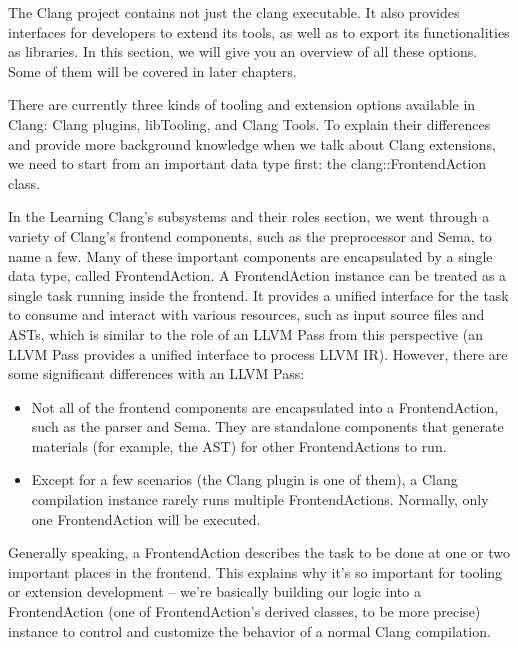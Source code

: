 
The Clang project contains not just the clang executable. It also provides interfaces for developers to extend its tools, as well as to export its functionalities as libraries. In this section, we will give you an overview of all these options. Some of them will be covered in later chapters.

There are currently three kinds of tooling and extension options available in Clang: Clang plugins, libTooling, and Clang Tools. To explain their differences and provide more background knowledge when we talk about Clang extensions, we need to start from an important data type first: the clang::FrontendAction class.


In the Learning Clang's subsystems and their roles section, we went through a variety of Clang's frontend components, such as the preprocessor and Sema, to name a few. Many of these important components are encapsulated by a single data type, called FrontendAction. A FrontendAction instance can be treated as a single task running inside the frontend. It provides a unified interface for the task to consume and interact with various resources, such as input source files and ASTs, which is similar to the role of an LLVM Pass from this perspective (an LLVM Pass provides a unified interface to process LLVM IR). However, there are some significant differences with an LLVM Pass:

\begin{itemize}
\item Not all of the frontend components are encapsulated into a FrontendAction, such as the parser and Sema. They are standalone components that generate materials (for example, the AST) for other FrontendActions to run.

\item Except for a few scenarios (the Clang plugin is one of them), a Clang compilation instance rarely runs multiple FrontendActions. Normally, only one FrontendAction will be executed.
\end{itemize}

Generally speaking, a FrontendAction describes the task to be done at one or two important places in the frontend. This explains why it's so important for tooling or extension development – we're basically building our logic into a FrontendAction (one of FrontendAction's derived classes, to be more precise) instance to control and customize the behavior of a normal Clang compilation.

